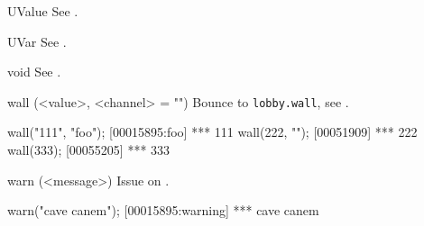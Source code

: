 \begin{urbiscriptapi}
\item[UValue] See .

\item[UVar] See .
\item[void] See .
\item[wall](<value>, <channel> = "")%
  Bounce to \lstinline|lobby.wall|, see .
\begin{urbiscript}
wall("111", "foo");
[00015895:foo] *** 111
wall(222, "");
[00051909] *** 222
wall(333);
[00055205] *** 333
\end{urbiscript}

\item[warn](<message>)%
  Issue  on .
\begin{urbiscript}
warn("cave canem");
[00015895:warning] *** cave canem
\end{urbiscript}

\end{urbiscriptapi}

